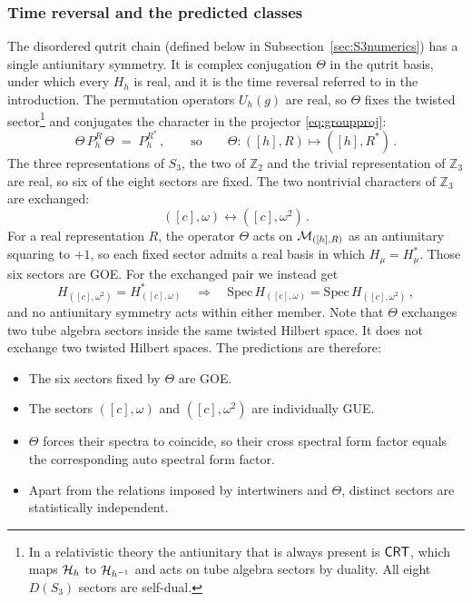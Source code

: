 \documentclass[11pt]{article}
\numberwithin{equation}{section}
\begin{document}
\subsubsection{Time reversal and the predicted classes}
\label{sec:S3CRT}

The disordered qutrit chain (defined below in Subsection~\ref{sec:S3numerics}) has a single antiunitary symmetry. It is
complex conjugation $\Theta$ in the qutrit basis, under which every $H_h$ is real, and it is the time
reversal referred to in the introduction. The permutation operators $U_h(g)$ are real, so $\Theta$
fixes the twisted sector\footnote{
In a relativistic theory the antiunitary that is always present is $\mathsf{CRT}$, which maps $\mathcal{H}_h$ to $\mathcal{H}_{h^{-1}}$ and acts on tube algebra sectors by duality. All eight $D(S_3)$ sectors are self-dual.} and conjugates the character in the projector \eqref{eq:groupproj}:
\begin{equation}
  \Theta\, P^{R}_h\, \Theta \;=\; P^{R^*}_h \,, \qquad\text{so}\qquad
  \Theta : ([h],R) \longmapsto ([h],R^*) \,.
  \label{eq:S3crt}
\end{equation}
The three representations of $S_3$, the two of
$\mathbb{Z}_2$ and the trivial representation of $\mathbb{Z}_3$ are real,  so six of the eight sectors are fixed. The two nontrivial characters of
$\mathbb{Z}_3$ are exchanged:
\begin{equation}
  ([c],\omega) \longleftrightarrow ([c],\omega^2) \,.
  \label{eq:S3pair}
\end{equation}
For a real representation $R$, the operator $\Theta$ acts on $\mathcal{M}_{([h],R)}$ as an antiunitary
squaring to $+1$, so each fixed sector admits a real basis in which $H_\mu = H_\mu^*$. Those
six sectors are GOE. For the exchanged pair we instead get
\begin{equation}
  H_{([c],\omega^2)} = H_{([c],\omega)}^* \quad \Longrightarrow \quad
  \mathrm{Spec}\, H_{([c],\omega)} = \mathrm{Spec}\, H_{([c],\omega^2)} \,,
  \label{eq:S3degen}
\end{equation}
and no antiunitary symmetry acts within either member. Note that $\Theta$ exchanges two tube algebra
sectors inside the same twisted Hilbert space. It does not exchange two twisted Hilbert spaces.
The predictions are therefore:
\begin{itemize}
  \item The six sectors fixed by $\Theta$ are GOE.
  \item The sectors $([c],\omega)$ and $([c],\omega^2)$ are individually GUE.
  \item $\Theta$ forces their spectra to coincide, so their cross spectral form factor equals the
        corresponding auto spectral form factor.
  \item Apart from the relations imposed by intertwiners and $\Theta$, distinct sectors are
        statistically independent.
\end{itemize}
\end{document}
